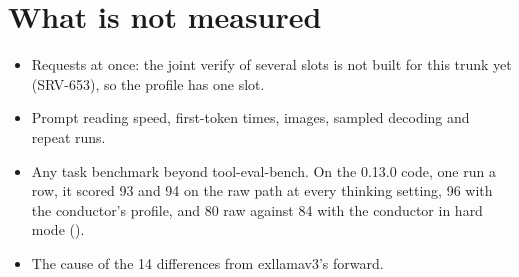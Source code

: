 \section{What is not measured}

\begin{itemize}
\item Requests at once: the joint verify of several slots is not built for this trunk yet (SRV-653), so the profile has one slot.
\item Prompt reading speed, first-token times, images, sampled decoding and repeat runs.
\item Any task benchmark beyond tool-eval-bench. On the 0.13.0 code, one run a row, it scored 93 and 94 on the raw path at every thinking setting, 96 with the conductor's  profile, and 80 raw against 84 with the conductor in hard mode ().
\item The cause of the 14 differences from exllamav3's forward.
\end{itemize}

